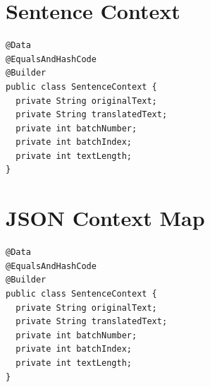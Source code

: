 \begin{listing}[H]
\caption{Translation service response}
\label{lst:translation_response}
\end{listing}

\section{Sentence Context}
\begin{listing}[H]
\begin{verbatim}
@Data
@EqualsAndHashCode
@Builder
public class SentenceContext {
  private String originalText;
  private String translatedText;
  private int batchNumber;
  private int batchIndex;
  private int textLength;
}
\end{verbatim}
\caption{Sentence Context Java Class}
\label{ref:SentenceContext}
\end{listing}

\section{JSON Context Map}
\begin{listing}[H]
\begin{verbatim}
@Data
@EqualsAndHashCode
@Builder
public class SentenceContext {
  private String originalText;
  private String translatedText;
  private int batchNumber;
  private int batchIndex;
  private int textLength;
}
\end{verbatim}
\caption{JSON context map}
\label{ref:context_map}
\end{listing}